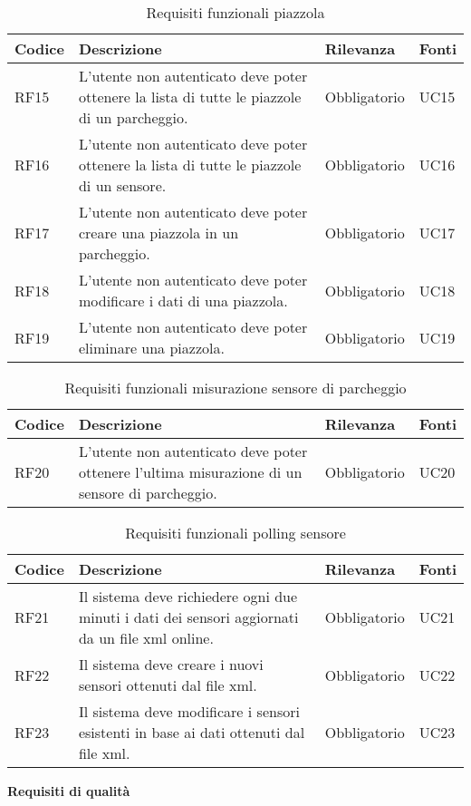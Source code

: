 \begin{table}[H]
    \begin{tabular}{|p{1cm}|p{6cm}|p{1.9cm}|p{1.8cm}|} 
    \hline
    Codice & Descrizione & Rilevanza &  Fonti \\ 
    \hline
    RF15 & L'utente non autenticato deve poter ottenere la lista di tutte le piazzole di un parcheggio. & Obbligatorio & UC15 \\ 
    \hline
    RF16 & L'utente non autenticato deve poter ottenere la lista di tutte le piazzole di un sensore. & Obbligatorio & UC16 \\ 
    \hline
    RF17 & L'utente non autenticato deve poter creare una piazzola in un parcheggio. & Obbligatorio & UC17 \\ 
    \hline
    RF18 & L'utente non autenticato deve poter modificare i dati di una piazzola. & Obbligatorio & UC18 \\
    \hline
    RF19 & L'utente non autenticato deve poter eliminare una piazzola. & Obbligatorio & UC19 \\
    \hline
    \end{tabular}
    \caption{Requisiti funzionali piazzola}
\end{table}

\begin{table}[H]
    \begin{tabular}{|p{1cm}|p{6cm}|p{1.9cm}|p{1.8cm}|} 
    \hline
    Codice & Descrizione & Rilevanza &  Fonti \\ 
    \hline
    RF20 & L'utente non autenticato deve poter ottenere l'ultima misurazione di un sensore di parcheggio. & Obbligatorio & UC20 \\ 
    \hline
    \end{tabular}
    \caption{Requisiti funzionali misurazione sensore di parcheggio}
\end{table}
\clearpage
\begin{table}[H]
    \begin{tabular}{|p{1cm}|p{6cm}|p{1.9cm}|p{1.8cm}|} 
    \hline
    Codice & Descrizione & Rilevanza &  Fonti \\ 
    \hline
    RF21 & Il sistema deve richiedere ogni due minuti i dati dei sensori aggiornati da un file \gls{xml} online. & Obbligatorio & UC21 \\ 
    \hline
    RF22 & Il sistema deve creare i nuovi sensori ottenuti dal file \gls{xml}. & Obbligatorio & UC22 \\ 
    \hline
    RF23 & Il sistema deve modificare i sensori esistenti in base ai dati ottenuti dal file \gls{xml}. & Obbligatorio & UC23 \\ 
    \hline
    \end{tabular}
    \caption{Requisiti funzionali polling sensore}
\end{table}
\leavevmode\newline
\textbf{Requisiti di qualità}

